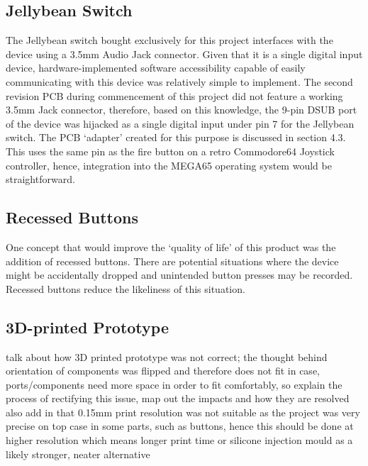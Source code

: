 \subsection{Jellybean Switch}

The Jellybean switch bought exclusively for this project interfaces with the device using a 3.5mm Audio Jack connector. 
Given that it is a single digital input device, hardware-implemented software accessibility capable of easily communicating with this device was relatively simple to implement. 
The second revision PCB during commencement of this project did not feature a working 3.5mm Jack connector, therefore, based on this knowledge, the 9-pin DSUB port of the device was hijacked as a single digital input under pin 7 for the Jellybean switch. 
The PCB ‘adapter’ created for this purpose is discussed in section 4.3. %
This uses the same pin as the fire button on a retro Commodore64 Joystick controller, hence, integration into the MEGA65 operating system would be straightforward.

\subsection{Recessed Buttons}


One concept that would improve the ‘quality of life’ of this product was the addition of recessed buttons. 
There are potential situations where the device might be accidentally dropped and unintended button presses may be recorded. 
Recessed buttons reduce the likeliness of this situation.

\subsection{3D-printed Prototype}

talk about how 3D printed prototype was not correct; the thought behind orientation of components was flipped and therefore does not fit in case, ports/components need more space in order to fit comfortably, so explain the process of rectifying this issue, map out the impacts and how they are resolved
also add in that 0.15mm print resolution was not suitable as the project was very precise on top case in some parts, such as buttons, hence this should be done at higher resolution which means longer print time or silicone injection mould as a likely stronger, neater alternative

